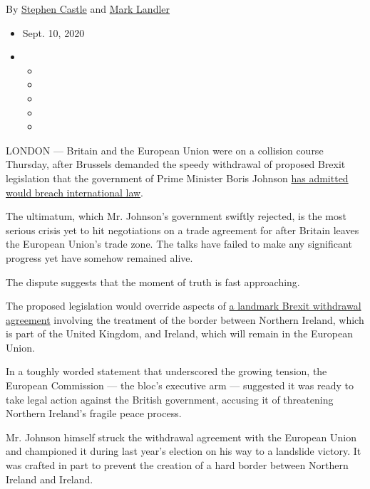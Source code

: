 By \href{https://www.nytimes3xbfgragh.onion/by/stephen-castle}{Stephen
Castle} and
\href{https://www.nytimes3xbfgragh.onion/by/mark-landler}{Mark Landler}

\begin{itemize}
\item
  Sept. 10, 2020
\item
  \begin{itemize}
  \item
  \item
  \item
  \item
  \item
  \end{itemize}
\end{itemize}

LONDON --- Britain and the European Union were on a collision course
Thursday, after Brussels demanded the speedy withdrawal of proposed
Brexit legislation that the government of Prime Minister Boris Johnson
\href{https://www.nytimes3xbfgragh.onion/2020/09/08/world/europe/boris-johnson-brexit-northern-ireland.html?searchResultPosition=1}{has
admitted would breach international law}.

The ultimatum, which Mr. Johnson's government swiftly rejected, is the
most serious crisis yet to hit negotiations on a trade agreement for
after Britain leaves the European Union's trade zone. The talks have
failed to make any significant progress yet have somehow remained alive.

The dispute suggests that the moment of truth is fast approaching.

The proposed legislation would override aspects of
\href{https://www.nytimes3xbfgragh.onion/2020/09/08/world/europe/boris-johnson-brexit-northern-ireland.html}{a
landmark Brexit withdrawal agreement} involving the treatment of the
border between Northern Ireland, which is part of the United Kingdom,
and Ireland, which will remain in the European Union.

In a toughly worded statement that underscored the growing tension, the
European Commission --- the bloc's executive arm --- suggested it was
ready to take legal action against the British government, accusing it
of threatening Northern Ireland's fragile peace process.

Mr. Johnson himself struck the withdrawal agreement with the European
Union and championed it during last year's election on his way to a
landslide victory. It was crafted in part to prevent the creation of a
hard border between Northern Ireland and Ireland.

